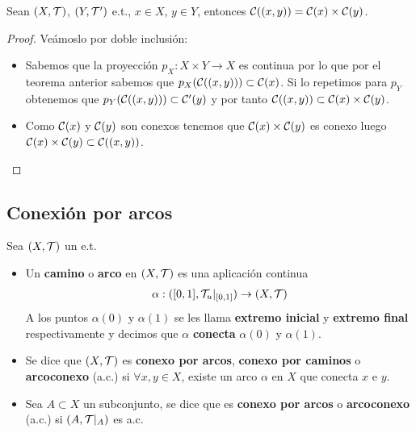 \begin{prop}
    Sean $(X, \mathcal{T})$, $(Y, \mathcal{T}')$ e.t., $x\in X$, $y\in Y$, entonces $\mathcal{C}((x,y))=\mathcal{C}(x)\times \mathcal{C}(y)$.
    \begin{proof}
        Veámoslo por doble inclusión:
        \begin{itemize}
            \item[$\subset$ )] Sabemos que la proyección $p_X:X\times Y \to X$ es continua por lo que por el teorema anterior sabemos que $p_X(\mathcal{C}((x,y)))\subset \mathcal{C}(x)$. Si lo repetimos para $p_Y$ obtenemos que $p_Y(\mathcal{C}((x,y)))\subset \mathcal{C}'(y)$ y por tanto $\mathcal{C}((x,y))\subset\mathcal{C}(x)\times \mathcal{C}(y)$.
            \item[$\supset$ )] Como $\mathcal{C}(x)$ y $\mathcal{C}(y)$ son conexos tenemos que $\mathcal{C}(x)\times \mathcal{C}(y)$ es conexo luego $\mathcal{C}(x)\times \mathcal{C}(y)\subset \mathcal{C}((x,y))$.
        \end{itemize}
    \end{proof}
\end{prop}

\subsection{Conexión por arcos}

\begin{definicion}
    Sea $(X, \mathcal{T})$ un e.t. 
    \begin{itemize}
        \item Un \textbf{camino} o \textbf{arco} en $(X, \mathcal{T})$ es una aplicación continua 
        \begin{align*}
            \alpha: ([0,1], \mathcal{T}_u|_{[0,1]})\to (X, \mathcal{T})
        \end{align*}
        A los puntos $\alpha(0)$ y $\alpha(1)$ se les llama \textbf{extremo inicial} y \textbf{extremo final} respectivamente y decimos que $\alpha$ \textbf{conecta} $\alpha(0)$ y $\alpha(1)$. 

        \item Se dice que $(X, \mathcal{T})$ es \textbf{conexo por arcos}, \textbf{conexo por caminos} o \textbf{arcoconexo} (a.c.) si $\forall x,y\in X$, existe un arco $\alpha$ en $X$ que conecta $x$ e $y$.

        \item Sea $A\subset X$ un subconjunto, se dice que es \textbf{conexo por arcos} o \textbf{arcoconexo} (a.c.) si $(A, \mathcal{T}|_A)$ es a.c.
     \end{itemize}
\end{definicion}

